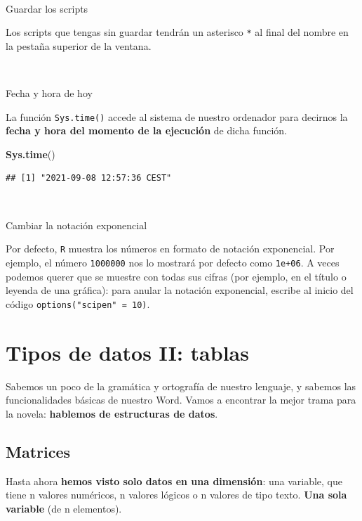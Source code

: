 \documentclass[11pt,]{book}
\newenvironment{Shaded}{\begin{snugshade}}{\end{snugshade}}
\newcommand{\KeywordTok}[1]{\textcolor[rgb]{0.27,0.27,0.27}{\textbf{#1}}}
\newcommand{\NormalTok}[1]{#1}
\begin{document}
~

Guardar los scripts

Los scripts que tengas sin guardar tendrán un asterisco \texttt{*} al final del nombre en la pestaña superior de la ventana.

~

Fecha y hora de hoy

La función \texttt{Sys.time()} accede al sistema de nuestro ordenador para decirnos la \textbf{fecha y hora del momento de la ejecución} de dicha función.

\begin{Shaded}
\begin{Highlighting}[]
\KeywordTok{Sys.time}\NormalTok{()}
\end{Highlighting}
\end{Shaded}

\begin{verbatim}
## [1] "2021-09-08 12:57:36 CEST"
\end{verbatim}

~

Cambiar la notación exponencial

Por defecto, \texttt{R} muestra los números en formato de notación exponencial. Por ejemplo, el número \texttt{1000000} nos lo mostrará por defecto como \texttt{1e+06}. A veces podemos querer que se muestre con todas sus cifras (por ejemplo, en el título o leyenda de una gráfica): para anular la notación exponencial, escribe al inicio del código \texttt{options("scipen"\ =\ 10)}.

\hypertarget{datos}{%
\chapter{Tipos de datos II: tablas}\label{datos}}

Sabemos un poco de la gramática y ortografía de nuestro lenguaje, y sabemos las funcionalidades básicas de nuestro Word. Vamos a encontrar la mejor trama para la novela: \textbf{hablemos de estructuras de datos}.

\hypertarget{matrices}{%
\section{Matrices}\label{matrices}}

Hasta ahora \textbf{hemos visto solo datos en una dimensión}: una variable, que tiene n valores numéricos, n valores lógicos o n valores de tipo texto. \textbf{Una sola variable} (de n elementos).
\end{document}
